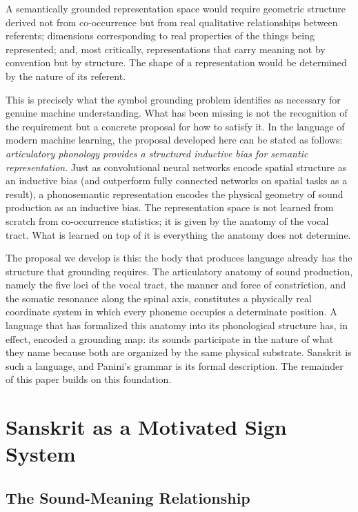 \documentclass[12pt]{article}
\begin{document}
A semantically grounded representation space would require geometric structure derived not from co-occurrence but from real qualitative relationships between referents; dimensions corresponding to real properties of the things being represented; and, most critically, representations that carry meaning not by convention but by structure. The shape of a representation would be determined by the nature of its referent.

This is precisely what the symbol grounding problem \citep{harnad1990} identifies as necessary for genuine machine understanding. What has been missing is not the recognition of the requirement but a concrete proposal for how to satisfy it. In the language of modern machine learning, the proposal developed here can be stated as follows: \textit{articulatory phonology provides a structured inductive bias for semantic representation}. Just as convolutional neural networks encode spatial structure as an inductive bias (and outperform fully connected networks on spatial tasks as a result), a phonosemantic representation encodes the physical geometry of sound production as an inductive bias. The representation space is not learned from scratch from co-occurrence statistics; it is given by the anatomy of the vocal tract. What is learned on top of it is everything the anatomy does not determine.

The proposal we develop is this: the body that produces language already has the structure that grounding requires. The articulatory anatomy of sound production, namely the five loci of the vocal tract, the manner and force of constriction, and the somatic resonance along the spinal axis, constitutes a physically real coordinate system in which every phoneme occupies a determinate position. A language that has formalized this anatomy into its phonological structure has, in effect, encoded a grounding map: its sounds participate in the nature of what they name because both are organized by the same physical substrate. Sanskrit is such a language, and Panini's grammar is its formal description. The remainder of this paper builds on this foundation.


\section{Sanskrit as a Motivated Sign System}

\subsection{The Sound-Meaning Relationship}
\end{document}
